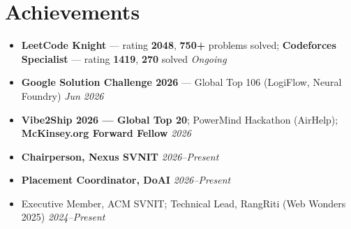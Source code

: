 \documentclass[a4paper,10pt]{article}
\newcommand{\sectionContentSpace}{\vspace{2mm}}
\begin{document}
\section{Achievements}
\sectionContentSpace
\begin{itemize}[leftmargin=3ex, rightmargin=2ex, noitemsep, topsep=4pt, parsep=0pt, partopsep=0pt, labelsep=1.2mm, itemsep=2pt]\small
  \item \textbf{LeetCode Knight} --- rating \textbf{2048}, \textbf{750+} problems solved; \textbf{Codeforces Specialist} --- rating \textbf{1419}, \textbf{270} solved \hfill \textit{Ongoing}
  \item \textbf{Google Solution Challenge 2026} --- Global Top 106 (LogiFlow, Neural Foundry) \hfill \textit{Jun 2026}
  \item \textbf{Vibe2Ship 2026 --- Global Top 20}; PowerMind Hackathon (AirHelp); \textbf{McKinsey.org Forward Fellow} \hfill \textit{2026}
  \item \textbf{Chairperson, Nexus SVNIT} \hfill \textit{2026--Present}
  \item \textbf{Placement Coordinator, DoAI} \hfill \textit{2026--Present}
  \item Executive Member, ACM SVNIT; Technical Lead, RangRiti (Web Wonders 2025) \hfill \textit{2024--Present}
\end{itemize}
\end{document}
